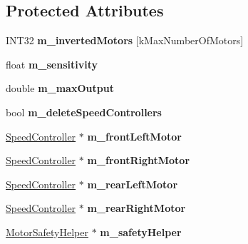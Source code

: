 \subsection*{\-Protected \-Attributes}
\begin{DoxyCompactItemize}
\item 
\hypertarget{classRobotDrive_abcfae675b4a3eaf7367618f8dfb41a50}{\-I\-N\-T32 {\bfseries m\-\_\-inverted\-Motors} \mbox{[}k\-Max\-Number\-Of\-Motors\mbox{]}}\label{classRobotDrive_abcfae675b4a3eaf7367618f8dfb41a50}

\item 
\hypertarget{classRobotDrive_a08cc0269fd9b61a9d8f533c1f177057f}{float {\bfseries m\-\_\-sensitivity}}\label{classRobotDrive_a08cc0269fd9b61a9d8f533c1f177057f}

\item 
\hypertarget{classRobotDrive_a7b0af5263a4f1bd6b8fb71a707ed291f}{double {\bfseries m\-\_\-max\-Output}}\label{classRobotDrive_a7b0af5263a4f1bd6b8fb71a707ed291f}

\item 
\hypertarget{classRobotDrive_ae25a1fa747dcdd56da954f16898b258e}{bool {\bfseries m\-\_\-delete\-Speed\-Controllers}}\label{classRobotDrive_ae25a1fa747dcdd56da954f16898b258e}

\item 
\hypertarget{classRobotDrive_a28786db2af3d04eb24e588c9e4e80d3a}{\hyperlink{classSpeedController}{\-Speed\-Controller} $\ast$ {\bfseries m\-\_\-front\-Left\-Motor}}\label{classRobotDrive_a28786db2af3d04eb24e588c9e4e80d3a}

\item 
\hypertarget{classRobotDrive_a2a9790639e06361f4031871a32509deb}{\hyperlink{classSpeedController}{\-Speed\-Controller} $\ast$ {\bfseries m\-\_\-front\-Right\-Motor}}\label{classRobotDrive_a2a9790639e06361f4031871a32509deb}

\item 
\hypertarget{classRobotDrive_ab8ce1d64314ba60a7d32675464b57bb9}{\hyperlink{classSpeedController}{\-Speed\-Controller} $\ast$ {\bfseries m\-\_\-rear\-Left\-Motor}}\label{classRobotDrive_ab8ce1d64314ba60a7d32675464b57bb9}

\item 
\hypertarget{classRobotDrive_a3ba480ac56e25001b3d1b30caeefef2f}{\hyperlink{classSpeedController}{\-Speed\-Controller} $\ast$ {\bfseries m\-\_\-rear\-Right\-Motor}}\label{classRobotDrive_a3ba480ac56e25001b3d1b30caeefef2f}

\item 
\hypertarget{classRobotDrive_ae10ae2087a59659a2a902e13da2b52d7}{\hyperlink{classMotorSafetyHelper}{\-Motor\-Safety\-Helper} $\ast$ {\bfseries m\-\_\-safety\-Helper}}\label{classRobotDrive_ae10ae2087a59659a2a902e13da2b52d7}

\end{DoxyCompactItemize}
